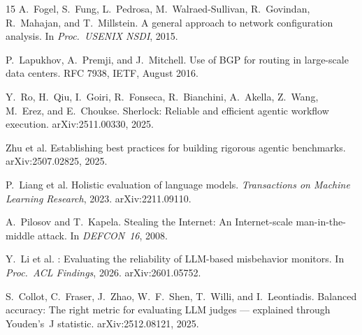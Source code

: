 \documentclass[11pt]{article}
\begin{document}
\begin{thebibliography}{15}
A.~Fogel, S.~Fung, L.~Pedrosa, M.~Walraed-Sullivan, R.~Govindan,
R.~Mahajan, and T.~Millstein.
\newblock A general approach to network configuration analysis.
\newblock In \emph{Proc.\ USENIX NSDI}, 2015.

P.~Lapukhov, A.~Premji, and J.~Mitchell.
\newblock Use of {BGP} for routing in large-scale data centers.
\newblock RFC 7938, IETF, August 2016.

Y.~Ro, H.~Qiu, I.~Goiri, R.~Fonseca, R.~Bianchini, A.~Akella, Z.~Wang,
M.~Erez, and E.~Choukse.
\newblock Sherlock: Reliable and efficient agentic workflow execution.
\newblock arXiv:2511.00330, 2025.

Zhu et al.
\newblock Establishing best practices for building rigorous agentic
benchmarks.
\newblock arXiv:2507.02825, 2025.

P.~Liang et al.
\newblock Holistic evaluation of language models.
\newblock \emph{Transactions on Machine Learning Research}, 2023.
arXiv:2211.09110.

A.~Pilosov and T.~Kapela.
\newblock Stealing the {Internet}: An {Internet}-scale man-in-the-middle attack.
\newblock In \emph{DEFCON~16}, 2008.

Y.~Li et al.
: Evaluating the reliability of {LLM}-based
misbehavior monitors.
\newblock In \emph{Proc.\ ACL Findings}, 2026. arXiv:2601.05752.

S.~Collot, C.~Fraser, J.~Zhao, W.~F.~Shen, T.~Willi, and I.~Leontiadis.
\newblock Balanced accuracy: The right metric for evaluating {LLM} judges ---
explained through {Youden's}~{J} statistic.
\newblock arXiv:2512.08121, 2025.

\end{thebibliography}
\end{document}
